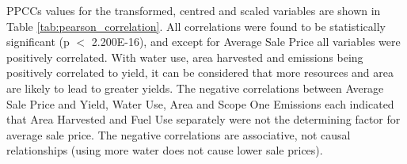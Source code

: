 \documentclass[review,12pt,authoryear]{elsarticle}
\begin{document}
\begin{linenumbers}
PPCCs values for the transformed, centred and scaled variables 
are shown in Table \ref{tab:pearson_correlation}. All correlations were found to be statistically significant (p $<$ 2.200E-16), and except for Average Sale Price all variables were positively correlated. With water use, area harvested and emissions being positively correlated to yield, it can be considered that more resources and area are likely to lead to greater yields. The negative correlations between Average Sale Price and Yield, Water Use, Area and Scope One Emissions each indicated that Area Harvested and Fuel Use separately were not the determining factor for average sale price. The negative correlations are associative, not causal relationships (using more water does not cause lower sale prices).
\par
\begin{table}[]
  \caption{Pairwise Pearson correlation coefficients for logarithmically transformed values.}\label{tab:pearson_correlation}
\end{table}
\end{linenumbers}
\end{document}
